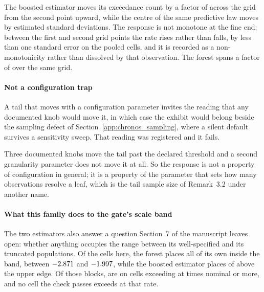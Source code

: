 \documentclass[preprint,11pt,authoryear]{elsarticle}
\newcommand{\1}{\boldsymbol{1}}
\begin{document}
The boosted estimator moves its exceedance count by a factor of
\nMLGbmTailSpan{} across the grid from the second point upward, while the centre
of the same predictive law moves by \nMLGbmCentreSpread{} estimated standard
deviations. The
response is not monotone at the fine end: between the first and second grid
points the rate rises rather than falls, by less than one standard error on the
pooled cells, and it is recorded as a non-monotonicity rather than dissolved by
that observation. The forest spans a factor of \nMLQrfTailSpan{} over the same
grid.

\paragraph{Not a configuration trap} A tail that moves with a configuration
parameter invites the reading that any documented knob would move it, in which
case the exhibit would belong beside the sampling defect of
Section~\ref{app:chronos_sampling}, where a silent default survives a sensitivity sweep.
That reading was registered and it fails.

\begin{table}[htbp]
	\centering
	\caption{Each control knob moved alone from the library default, leaf size
		held at $\texttt{min\_data\_in\_leaf} = \nMLGbmLeafDefault$, where
		$\hat\pi = \nMLGbmPiDefault$. The range spans the swept values
		\emph{and} the default, which is a point on it; reading the swept values
		alone puts $\texttt{max\_depth}$ on the other side of the threshold. The
		threshold of $\nMLKnobThreshold$ was declared before the arm ran.}
	\label{tab:ml_knobs}
	\footnotesize
	
\end{table}

Three documented knobs move the tail past the declared threshold and a second
granularity parameter does not move it at all. So the response is not a property
of configuration in general; it is a property of the parameter that sets how many
observations resolve a leaf, which is the tail sample size of Remark~3.2 under
another name.

\paragraph{What this family does to the gate's scale band} The two estimators
also answer a question Section~7 of the manuscript leaves open: whether anything
occupies the range between its well-specified and its truncated populations. Of
the \nMLCells{} cells here, the forest places all \nMLQrfCells{} of its own
inside the band, between $-2.871$ and $-1.997$, while the boosted
estimator places \nMLGbmBlocked{} of \nMLGbmCells{} above the upper edge. Of
those \nMLGbmBlocked{} blocks, \nMLBlockedUnder{} are on cells exceeding at
\nMLUnderThreshold{} times nominal or more, and no cell the check passes exceeds
at that rate.
\end{document}
